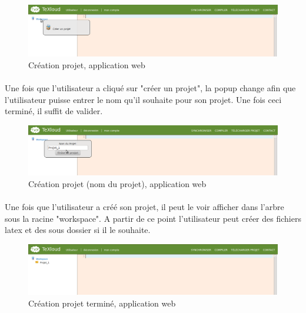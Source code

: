 \documentclass[a4paper,12pt]{article}
\begin{document}
\begin{figure}[!ht]
\begin{center}
  \includegraphics[width=1\textwidth]{./images/screenshot/CreeProjet.png}
\end{center}
  \caption{Création projet, application web}
  \label{createProjectWeb}
\end{figure}

\paragraph*{}
Une fois que l'utilisateur a cliqué sur "créer un projet", la popup change afin que l'utilisateur puisse entrer le nom qu'il souhaite pour son projet. Une fois ceci terminé, il suffit de valider.

\begin{figure}[!ht]
\begin{center}
  \includegraphics[width=1\textwidth]{./images/screenshot/Suite_Creation_Projet.png}
\end{center}
  \caption{Création projet (nom du projet), application web}
  \label{suiteCreationProjet}
\end{figure}

\clearpage
\paragraph*{}
Une fois que l'utilisateur a créé son projet, il peut le voir afficher dans l'arbre sous la racine "workspace". A partir de ce point l'utilisateur peut créer des fichiers latex et des sous dossier si il le souhaite.

\begin{figure}[!ht]
\begin{center}
  \includegraphics[width=1\textwidth]{./images/screenshot/Suite2_Creation_Projet.png}
\end{center}
  \caption{Création projet terminé, application web}
  \label{suite2CreationProjet}
\end{figure}
\end{document}
